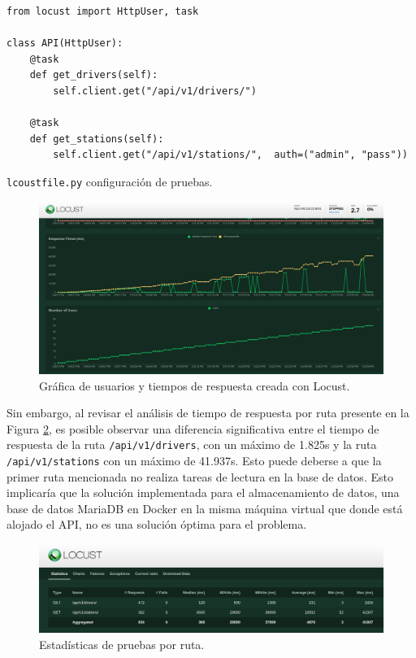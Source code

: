 \begin{listing}
\begin{verbatim}
from locust import HttpUser, task

class API(HttpUser):
    @task
    def get_drivers(self):
        self.client.get("/api/v1/drivers/")

    @task
    def get_stations(self):
        self.client.get("/api/v1/stations/",  auth=("admin", "pass"))
\end{verbatim}
\caption{\texttt{lcoustfile.py} configuración de pruebas.}
\label{lst:locust-config}
\end{listing}


\begin{figure}[!ht]
   \centering
   \includegraphics[width=1\linewidth]{images/screenshots/locust_graphs.png}
   \caption{Gráfica de usuarios y tiempos de respuesta creada con Locust.}
   \label{fig:locust-graphs}
\end{figure}

Sin embargo, al revisar el análisis de tiempo de respuesta por ruta presente en la Figura \ref{fig:locust-analysis}, es posible observar una diferencia significativa entre el tiempo de respuesta de la ruta \texttt{/api/v1/drivers}, con un máximo de 1.825s y la ruta \texttt{/api/v1/stations} con un máximo de 41.937s. Esto puede deberse a que la primer ruta mencionada no realiza tareas de lectura en la base de datos. Esto implicaría que la solución implementada para el almacenamiento de datos, una base de datos MariaDB en Docker en la misma máquina virtual que donde está alojado el API, no es una solución óptima para el problema.

\begin{figure}[!ht]
   \centering
   \includegraphics[width=1\linewidth]{images/screenshots/locust_analysis.png}
   \caption{Estadísticas de pruebas por ruta.}
   \label{fig:locust-analysis}
\end{figure}

